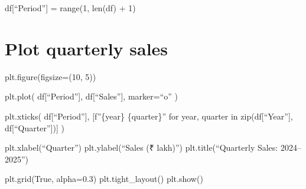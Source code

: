 \documentclass[
  a4paper,
]{article}
\begin{document}
df{[}``Period''{]} = range(1, len(df) + 1)

\section{Plot quarterly sales}\label{plot-quarterly-sales}

plt.figure(figsize=(10, 5))

plt.plot( df{[}``Period''{]}, df{[}``Sales''{]}, marker=``o'' )

plt.xticks( df{[}``Period''{]}, {[}f''\{year\} \{quarter\}'' for year,
quarter in zip(df{[}``Year''{]}, df{[}``Quarter''{]}){]} )

plt.xlabel(``Quarter'') plt.ylabel(``Sales (₹ lakh)'')
plt.title(``Quarterly Sales: 2024--2025'')

plt.grid(True, alpha=0.3) plt.tight\_layout() plt.show()
\end{document}
